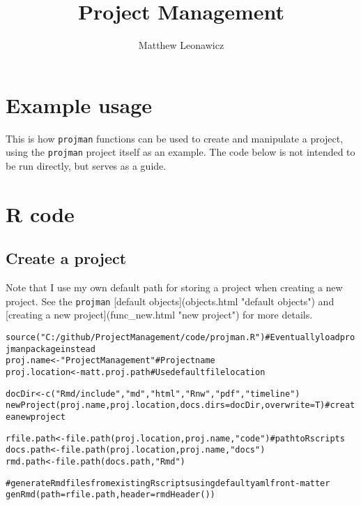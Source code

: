 \documentclass{article}\usepackage[]{graphicx}\usepackage[]{color}
\makeatletter
\newcommand{\hlstr}[1]{\textcolor[rgb]{0.863,0.196,0.184}{#1}}%
\newcommand{\hlcom}[1]{\textcolor[rgb]{0.345,0.431,0.459}{#1}}%
\newcommand{\hlstd}[1]{\textcolor[rgb]{0.514,0.58,0.588}{#1}}%
\newcommand{\hlkwb}[1]{\textcolor[rgb]{0.522,0.6,0}{#1}}%
\newcommand{\hlkwc}[1]{\textcolor[rgb]{0.796,0.294,0.086}{#1}}%
\newcommand{\hlkwd}[1]{\textcolor[rgb]{0.576,0.631,0.631}{#1}}%
\newenvironment{kframe}{%
 \def\at@end@of@kframe{}%
 \ifinner\ifhmode%
  \def\at@end@of@kframe{\end{minipage}}%
  \begin{minipage}{\columnwidth}%
 \fi\fi%
 \def\FrameCommand##1{\hskip\@totalleftmargin \hskip-\fboxsep
 \colorbox{shadecolor}{##1}\hskip-\fboxsep
     \hskip-\linewidth \hskip-\@totalleftmargin \hskip\columnwidth}%
 \MakeFramed {\advance\hsize-\width
   \@totalleftmargin\z@ \linewidth\hsize
   \@setminipage}}%
 {\par\unskip\endMakeFramed%
 \at@end@of@kframe}
\newenvironment{knitrout}{}{} %
\makeatother
\begin{document}
\title{Project Management}
\author{Matthew Leonawicz}
\maketitle





\section{Example usage}
This is how \texttt{projman} functions can be used to create and manipulate a project, using the \texttt{projman} project itself as an example.
The code below is not intended to be run directly, but serves as a guide.

\section{R code}

\subsection{Create a project}
Note that I use my own default path for storing a project when creating a new project.
See the \texttt{projman} [default objects](objects.html "default objects") and [creating a new project](func\_new.html "new project") for more details.

\begin{knitrout}
\color{fgcolor}\begin{kframe}
\begin{alltt}
\hlkwd{source}\hlstd{(}\hlstr{"C:/github/ProjectManagement/code/projman.R"}\hlstd{)}  \hlcom{# Eventually load projman package instead}
\hlstd{proj.name} \hlkwb{<-} \hlstr{"ProjectManagement"}  \hlcom{# Project name}
\hlstd{proj.location} \hlkwb{<-} \hlstd{matt.proj.path}  \hlcom{# Use default file location}

\hlstd{docDir} \hlkwb{<-} \hlkwd{c}\hlstd{(}\hlstr{"Rmd/include"}\hlstd{,} \hlstr{"md"}\hlstd{,} \hlstr{"html"}\hlstd{,} \hlstr{"Rnw"}\hlstd{,} \hlstr{"pdf"}\hlstd{,} \hlstr{"timeline"}\hlstd{)}
\hlkwd{newProject}\hlstd{(proj.name, proj.location,} \hlkwc{docs.dirs} \hlstd{= docDir,} \hlkwc{overwrite} \hlstd{= T)}  \hlcom{# create a new project}

\hlstd{rfile.path} \hlkwb{<-} \hlkwd{file.path}\hlstd{(proj.location, proj.name,} \hlstr{"code"}\hlstd{)}  \hlcom{# path to R scripts}
\hlstd{docs.path} \hlkwb{<-} \hlkwd{file.path}\hlstd{(proj.location, proj.name,} \hlstr{"docs"}\hlstd{)}
\hlstd{rmd.path} \hlkwb{<-} \hlkwd{file.path}\hlstd{(docs.path,} \hlstr{"Rmd"}\hlstd{)}

\hlcom{# generate Rmd files from existing R scripts using default yaml front-matter}
\hlkwd{genRmd}\hlstd{(}\hlkwc{path} \hlstd{= rfile.path,} \hlkwc{header} \hlstd{=} \hlkwd{rmdHeader}\hlstd{())}
\end{alltt}
\end{kframe}
\end{knitrout}
\end{document}
